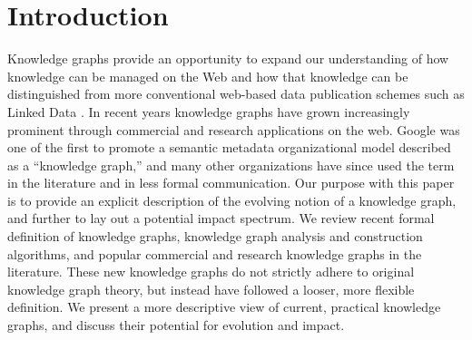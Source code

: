 \section{Introduction}


Knowledge graphs provide an opportunity to expand our understanding of how knowledge can be managed on the Web and how that knowledge can be distinguished from more conventional web-based data publication schemes such as Linked Data \cite{bizer2009linked}.
In recent years knowledge graphs have grown increasingly prominent through commercial and research applications on the web.
Google was one of the first to promote a semantic metadata organizational model described as a ``knowledge graph,'' \cite{singhal2012introducing} and many other organizations have since used the term in the literature and in less formal communication.
Our purpose with this paper is to provide an explicit description of the evolving notion of a knowledge graph, and further to lay out a potential impact spectrum.  
We review recent formal definition of knowledge graphs, knowledge graph analysis and construction algorithms, and popular commercial and research knowledge graphs in the literature.
These new knowledge graphs do not strictly adhere to original knowledge graph theory, but instead have followed a looser, more flexible definition.
We present a more descriptive view of current, practical knowledge graphs, and discuss their potential for evolution and impact.
